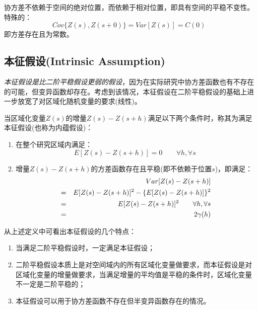\textcolor[rgb]{1,0,0}{协方差不依赖于空间的绝对位置，而依赖于相对位置，即具有空间的平稳不变性}。特殊的：
\begin{equation}
    Cov\{ Z(s),Z(s+0) \} = Var[Z(s)] = C(0)
    \label{eq-h0cov}
\end{equation}
即方差存在且为常数。


\subsection{本征假设(Intrinsic Assumption)}
\emph{\textcolor[rgb]{1,0,0}{本征假设是比二阶平稳假设更弱的假设}}，因为在实际研究中协方差函数也有不存在的可能，但变异函数却存在。考虑到该情况，本征假设在二阶平稳假设的基础上进一步放宽了对区域化随机变量的要求(线性)。

当区域化变量$Z(s)$的增量$Z(s)-Z(s+h)$满足以下两个条件时，称其为满足本征假设(也称为内蕴假设)：
\begin{enumerate}
    \item 在整个研究区域内满足：
        \begin{equation}
            E[Z(s)-Z(s+h)] = 0 \qquad \forall h, \forall s
            \label{eq-intrinsiccondition1}
        \end{equation}
    \item 增量$Z(s)-Z(s+h)$的方差函数存在且平稳(即不依赖于位置$s$)，即满足：
        \begin{eqnarray}
            && Var[Z(s)-Z(s+h)] \notag \\
            &=& E[Z(s)-Z(s+h)]^2 - \{ E[Z(s)-Z(s+h)] \}^2 \notag \\
            &=& E[Z(s)-Z(s+h)]^2 \qquad \forall h, \forall s \\
            &=& 2 \gamma (h) \notag
            \label{eq-intrinsiccondition2}
        \end{eqnarray}
\end{enumerate}

从上述定义中可看出本征假设的几个特点：
\begin{enumerate}
    \item 当满足二阶平稳假设时，一定满足本征假设；
    \item 二阶平稳假设本质上是\textcolor[rgb]{1,0,0}{对空间域内的所有区域化变量做要求，而本征假设是对区域化变量的增量做要求}，当满足增量的平均值是平稳的条件时，区域化变量不一定是二阶平稳的；
    \item 本征假设可以用于\textcolor[rgb]{1,0,0}{协方差函数不存在但半变异函数存在的情况}。
\end{enumerate}



